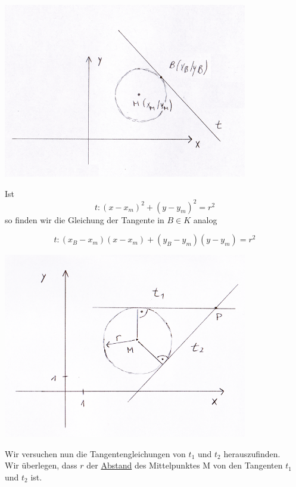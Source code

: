 \begin{center}
	 \includegraphics[width=0.8\textwidth]{imgs/tangenten_NichtAufUrsprung.png}
\end{center}
Ist 
\begin{equation*}t: (x-x_m)^2 + (y-y_m)^2 = r^2\end{equation*}
so finden wir die Gleichung der Tangente in $B \in K$ analog
\begin{mathbox}
	\begin{equation*}t: (x_B -x_m)(x-x_m)+(y_B -y_m)(y-y_m) = r^2\end{equation*}
\end{mathbox}
\newpage
\begin{center}
	 \includegraphics[width=0.8\textwidth]{imgs/tangenten.png}
\end{center}
Wir versuchen nun die Tangentengleichungen von $t_1$ und $t_2$ herauszufinden.\\
Wir überlegen, dass $r$ der \underline{Abstand} des Mittelpunktes M von den Tangenten $t_1$ und $t_2$ ist.\\
